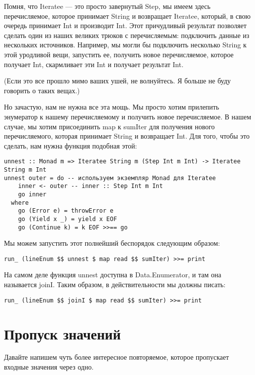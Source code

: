 Помня, что Iteratee --- это просто завернутый Step, мы имеем здесь перечисляемое, которое принимает String и возвращает Iteratee, который, в свою очередь принимает Int и производит Int. Этот причудливый результат позволяет сделать один из наших великих трюков с перечисляемым: подключить данные из нескольких источников. Например, мы могли бы подключить несколько String к этой уродливой вещи, запустить ее, получить новое перечисляемое, которое получает Int, скармливает эти Int и получает результат Int.

(Если это все прошло мимо ваших ушей, не волнуйтесь. Я больше не буду говорить о таких вещах.)

Но зачастую, нам не нужна все эта мощь. Мы просто хотим прилепить энумератор к нашему перечисляемому и получить новое перечисляемое. В нашем случае, мы хотим присоединить map к sumIter для получения нового перечисляемого, которая принимает String и возвращает Int. Для того, чтобы это сделать, нам нужна функция подобная этой:

\begin{lstlisting}
unnest :: Monad m => Iteratee String m (Step Int m Int) -> Iteratee String m Int
unnest outer = do -- используем экземпляр Monad для Iteratee
    inner <- outer -- inner :: Step Int m Int
    go inner
  where
    go (Error e) = throwError e
    go (Yield x _) = yield x EOF
    go (Continue k) = k EOF >>== go
\end{lstlisting}

Мы можем запустить этот полнейший беспорядок следующим образом:

\begin{lstlisting}
run_ (lineEnum $$ unnest $ map read $$ sumIter) >>= print
\end{lstlisting}%

На самом деле функция unnest доступна в Data.Enumerator, и там она называется joinI. Таким образом, в действительности мы должны писать:

\begin{lstlisting}
run_ (lineEnum $$ joinI $ map read $$ sumIter) >>= print
\end{lstlisting}%

\section{Пропуск значений}

Давайте напишем чуть более интересное повторяемое, которое пропускает входные значения через одно.

